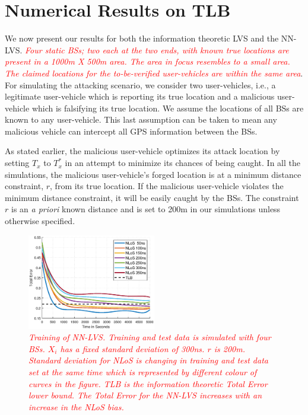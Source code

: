 \documentclass[journal]{IEEEtran}
\begin{document}
\section{Numerical Results on TLB}
We now present our results for both the information theoretic LVS and the NN-LVS. \textcolor{red}{\textit{Four static BSs; two each at the two ends, with known true locations are present in a 1000m X 500m area. The area in focus resembles to a small area. The claimed locations for the to-be-verified user-vehicles are within the same area}}. For simulating the attacking scenario, we consider two user-vehicles, i.e., a legitimate user-vehicle which is reporting its true location and a malicious user-vehicle which is falsifying its true location. We assume the locations of all BSs are known to any user-vehicle. This last assumption can be taken to mean any malicious vehicle can intercept all GPS information between the BSs.

As stated earlier, the malicious user-vehicle optimizes its attack location by setting $T_x$ to $T_x^*$ in an attempt to minimize its chances of being caught. In all the simulations, the malicious user-vehicle's forged location is at a minimum distance constraint, $r$, from its true location. If the malicious user-vehicle  violates the minimum distance constraint, it will be easily caught by the BSs. The constraint $r$ is an \emph{a priori} known distance and is set to 200m in our  simulations unless otherwise specified.
\begin{figure}[t!]
\includegraphics[width=0.5\textwidth]{7-T300-r200-V4-Exp-Changing-NLoS.eps}
\caption{\textcolor{red}{\textit{Training of NN-LVS. Training and test data is simulated with four BSs. $X_i$ has a fixed standard deviation of 300ns. $r$ is 200m. Standard deviation for NLoS is changing in training and test data set at the same time which is represented by different colour of curves in the figure.  TLB is the information theoretic Total Error lower bound. The Total Error for the NN-LVS increases with an increase in the NLoS bias.}}\label{New_1}}
\end{figure}
\end{document}
